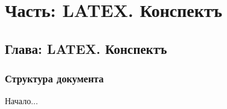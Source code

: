 






\tableofcontents

\part{Часть: LATEX. Конспектъ}
\chapter{Глава: LATEX. Конспектъ}
\section{Структура документа}

Начало...

\appendix






